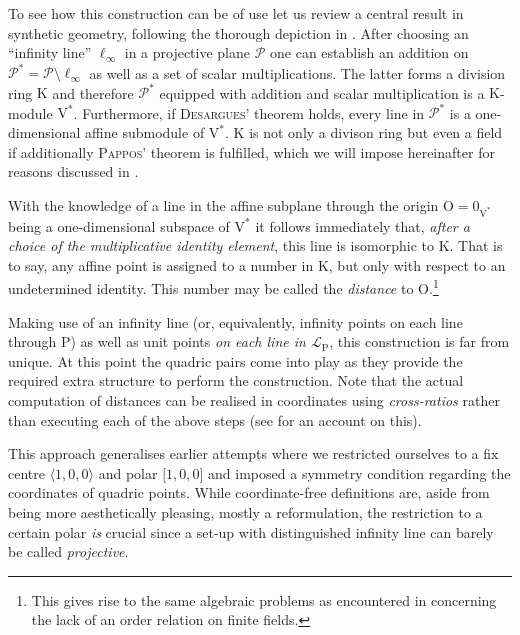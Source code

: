 \documentclass[12pt,english,paper=a4,DIV=12,headings=small,numbers=noenddot,parskip=half]{scrartcl}
\theoremstyle{definition}
\begin{document}
To see how this construction can be of use let us review a central result in synthetic geometry, following the thorough depiction in \cite{Beutelspacher:2004}. After choosing an ``infinity line'' $\ell_\infty$ in a projective plane $\mathscr{P}$ one can establish an addition on $\mathscr{P}^*=\mathscr{P}\setminus\ell_\infty$ as well as a set of scalar multiplications. The latter forms a division ring $\mathrm{K}$ and therefore $\mathscr{P}^*$ equipped with addition and scalar multiplication is a $\mathrm{K}$-module $\mathrm{V}^*$. Furthermore, if \textsc{Desargues}' theorem holds, every line in $\mathscr{P}^*$ is a one-dimensional affine submodule of $\mathrm{V}^*$. $\mathrm{K}$ is not only a divison ring but even a field if additionally \textsc{Pappos}' theorem is fulfilled, which we will impose hereinafter for reasons discussed in \cite{Alex:Th12}.

With the knowledge of a line in the affine subplane through the origin $\mathrm{O}=0_{\mathrm{V}^*}$ being a one-dimensional subspace of $\mathrm{V}^*$ it follows immediately that, \emph{after a choice of the multiplicative identity element}, this line is isomorphic to $\mathrm{K}$. That is to say, any affine point is assigned to a number in $\mathrm{K}$, but only with respect to an undetermined identity. This number may be called the \emph{distance} to $\mathrm{O}$.\footnote{This gives rise to the same algebraic problems as encountered in \cite{AlKr:2013} concerning the lack of an order relation on finite fields.}

Making use of an infinity line (or, equivalently, infinity points on each line through $\mathrm{P}$) as well as unit points \emph{on each line in $\mathscr{L}_\mathrm{P}$}, this construction is far from unique. At this point the quadric pairs come into play as they provide the required extra structure to perform the construction. Note that the actual computation of distances can be realised in coordinates using \emph{cross-ratios} rather than executing each of the above steps (see \cite{Alex:2013} for an account on this).

This approach generalises earlier attempts where we restricted ourselves to a fix centre $\langle1,0,0\rangle$ and polar $\lbrack1,0,0\rbrack$ and imposed a symmetry condition regarding the coordinates of quadric points. While coordinate-free definitions are, aside from being more aesthetically pleasing, mostly a reformulation, the restriction to a certain polar \emph{is} crucial since a set-up with distinguished infinity line can barely be called \emph{projective}.
\end{document}

